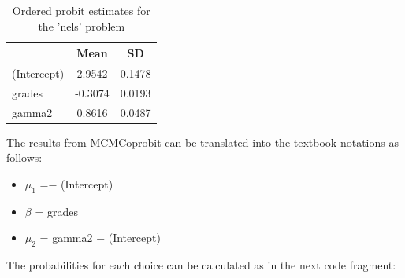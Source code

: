 \documentclass[]{book}
\newenvironment{Shaded}{\begin{snugshade}}{\end{snugshade}}
\newcommand{\DataTypeTok}[1]{\textcolor[rgb]{0.13,0.29,0.53}{#1}}
\newcommand{\DecValTok}[1]{\textcolor[rgb]{0.00,0.00,0.81}{#1}}
\newcommand{\KeywordTok}[1]{\textcolor[rgb]{0.13,0.29,0.53}{\textbf{#1}}}
\newcommand{\NormalTok}[1]{#1}
\newcommand{\OperatorTok}[1]{\textcolor[rgb]{0.81,0.36,0.00}{\textbf{#1}}}
\newcommand{\StringTok}[1]{\textcolor[rgb]{0.31,0.60,0.02}{#1}}
\providecommand{\tightlist}{%
  \setlength{\itemsep}{0pt}\setlength{\parskip}{0pt}}
\begin{document}
\begin{Shaded}
\end{Shaded}

\begin{table}

\caption{\label{tab:unnamed-chunk-138}Ordered probit estimates for the 'nels' problem}
\centering
\begin{tabular}[t]{l|c|c}
\hline
  & Mean & SD\\
\hline
(Intercept) & 2.9542 & 0.1478\\
\hline
grades & -0.3074 & 0.0193\\
\hline
gamma2 & 0.8616 & 0.0487\\
\hline
\end{tabular}
\end{table}

The results from MCMCoprobit can be translated into the textbook
notations as follows:

\begin{itemize}
\tightlist
\item
  \(\mu_1\) =− (Intercept)
\item
  \(\beta\) = grades
\item
  \(\mu_2\) = gamma2 − (Intercept)
\end{itemize}

The probabilities for each choice can be calculated as in the next code
fragment:
\end{document}
